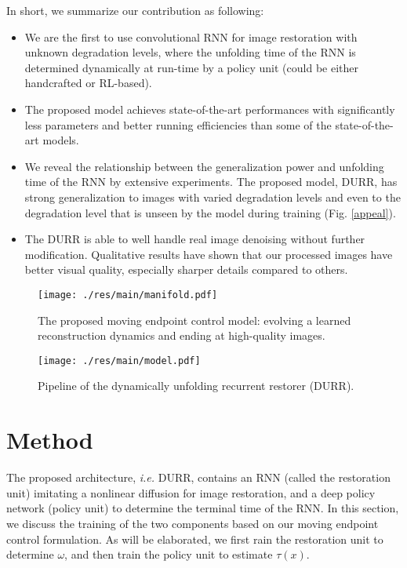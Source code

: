 \documentclass{article} %
\begin{document}
In short, we summarize our contribution as following:
\begin{itemize}
	\item We are the first to use convolutional RNN for image restoration
	with unknown degradation levels, where the unfolding time of the RNN
	is determined dynamically at run-time by a policy unit (could be either
	handcrafted or RL-based).
	\item The proposed model achieves state-of-the-art performances
	with significantly less parameters and better running efficiencies
	than some of the state-of-the-art models.
	\item We reveal the relationship between the generalization power
	and unfolding time of the RNN by extensive experiments.
	The proposed model, DURR, has strong generalization to images
	with varied degradation levels and even to the degradation level
	that is unseen by the model during training (Fig. \ref{appeal}).
	\item The DURR is able to well handle real image denoising
	without further modification. Qualitative results have shown that
	our processed images have better visual quality,
	especially sharper details compared to others.
\end{itemize}


\begin{figure}[ht]
	\centering
	\texttt{[image: ./res/main/manifold.pdf]}
	\caption{The proposed moving endpoint control model: evolving a learned reconstruction dynamics and ending at high-quality images.}
	\label{model}
\end{figure}

\begin{figure}[ht]
	\centering
	\texttt{[image: ./res/main/model.pdf]}
	\caption{Pipeline of the dynamically unfolding recurrent restorer (DURR).}
	\label{rlrnn}
\end{figure}

\section{Method}

The proposed architecture, \textit{i.e.} DURR, contains an RNN (called the restoration unit) imitating a nonlinear diffusion for image restoration, and a deep policy network (policy unit) to determine the terminal time of the RNN. In this section, we discuss the training of the two components based on our moving endpoint control formulation. As will be elaborated, we first rain the restoration unit to determine $\omega$, and then train the policy unit to estimate $\tau(x)$.
\end{document}
